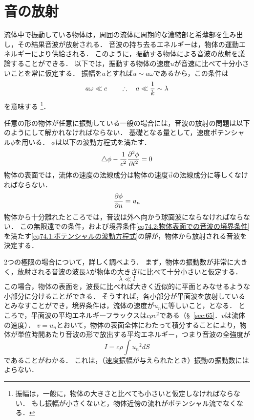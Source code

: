 \section{音の放射}
\label{sec:74}

流体中で振動している物体は，周囲の流体に周期的な濃縮部と希薄部を生み出し，その結果音波が放射される．
音波の持ち去るエネルギーは，物体の運動エネルギーにより供給される．
このように，振動する物体による音波の放射を議論することができる．
以下では，振動する物体の速度$u$が音速に比べて十分小さいことを常に仮定する．
振幅を$a$とすれば$u \sim a\omega$であるから，この条件は
\[
    a\omega \ll c
    \qquad\therefore\quad a \ll \frac{1}{k} \sim \lambda
\]
を意味する
\footnote{振幅は，一般に，物体の大きさと比べても小さいと仮定しなければならない．
もし振幅が小さくないと，物体近傍の流れがポテンシャル流でなくなる．}．



任意の形の物体が任意に振動している一般の場合には，音波の放射の問題は以下のようにして解かれなければならない．
基礎となる量として，速度ポテンシャル$\phi$を用いる．
$\phi$は以下の波動方程式を満たす．
\begin{equation}\label{eq74.1:ポテンシャルの波動方程式}
    \triangle \phi - \frac{1}{c^2} \pdv[2]{\phi}{t} = 0
\end{equation}
物体の表面では，流体の速度の法線成分は物体の速度$\vec{u}$の法線成分に等しくなければならない．
\begin{equation}\label{eq74.2:物体表面での音波の境界条件}
    \pdv{\phi}{n} = u_n
\end{equation}
物体から十分離れたところでは，音波は外へ向かう球面波にならなければならない．
この無限遠での条件，および境界条件\eqref{eq74.2:物体表面での音波の境界条件}を満たす\eqref{eq74.1:ポテンシャルの波動方程式}の解が，物体から放射される音波を決定する．



2つの極限の場合について，詳しく調べよう．
まず，物体の振動数が非常に大きく，放射される音波の波長$\lambda$が物体の大きさ$l$に比べて十分小さいと仮定する．
\begin{equation}
    \lambda \ll l
\end{equation}
この場合，物体の表面を，波長に比べれば大きく近似的に平面とみなせるような小部分に分けることができる．
そうすれば，各小部分が平面波を放射しているとみなすことができ，境界条件は，流体の速度が$u_n$に等しいこと，となる．
ところで，平面波の平均エネルギーフラックスは$c\rho v^2$である（\S~\ref{sec:65}．$v$は流体の速度）．
$v=u_n$とおいて，物体の表面全体にわたって積分することにより，物体が単位時間あたり音波の形で放出する平均エネルギー，つまり音波の全強度が
\begin{equation}
    I = c\rho \int \overline{{u_n}^2} dS
\end{equation}
であることがわかる．
これは，（速度振幅が与えられたとき）振動の振動数にはよらない．



